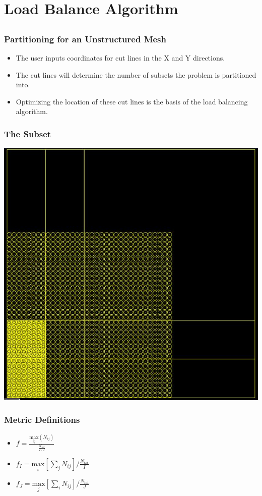 \documentclass[]{beamer}
\begin{document}
\section{Load Balance Algorithm}
\subsection{}

\begin{frame}[t]\frametitle{Partitioning for an Unstructured Mesh}
\begin{block}{}
	\begin{itemize}
	\item The user inputs coordinates for cut lines in the X and Y directions.
	\item The cut lines will determine the number of subsets the problem is partitioned into.
	\item Optimizing the location of these cut lines is the basis of the load balancing algorithm.
	\end{itemize}
\end{block}
\end{frame}

\begin{frame}[t]\frametitle{The Subset}
\centering
\includegraphics[width = 12 cm, height = 7 cm ]{figures/subsetlattice.png}
\end{frame}

\begin{frame}[t]\frametitle{Metric Definitions}
	\begin{block}{}
		\begin{itemize}
			\item $f =\frac{\underset{ij}{\text{max}}(N_{ij})}{\frac{N_{tot}}{I\cdot J}}$
			\item $f_I = \underset{i}{\text{max}}[\sum_{j} N_{ij}]/\frac{N_{tot}}{I}$
			\item $f_J = \underset{j}{\text{max}}[\sum_{i} N_{ij}]/\frac{N_{tot}}{J}$
		\end{itemize}
	\end{block}
\end{frame}
\end{document}
